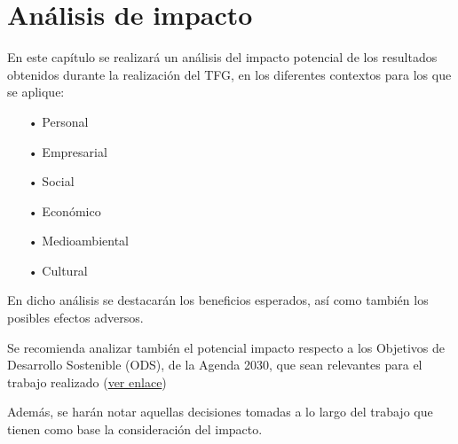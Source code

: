 \chapter{Análisis de impacto}
En este capítulo se realizará un análisis del impacto potencial de los resultados obtenidos durante la realización del TFG, en los diferentes contextos para los que se aplique:

\begin{enumerate}
\item[•] Personal
\item[•] Empresarial
\item[•] Social
\item[•] Económico
\item[•] Medioambiental
\item[•] Cultural
\end{enumerate}

En dicho análisis se destacarán los beneficios esperados, así como también los posibles efectos adversos.

Se recomienda analizar también el potencial impacto respecto a los Objetivos de Desarrollo Sostenible (ODS), de la Agenda 2030, que sean relevantes para el trabajo realizado (\href{https://www.un.org/sustainabledevelopment/es/objetivos-de-desarrollo-sostenible/}{ver enlace})

Además, se harán notar aquellas decisiones tomadas a lo largo del trabajo que tienen como base la consideración del impacto.
